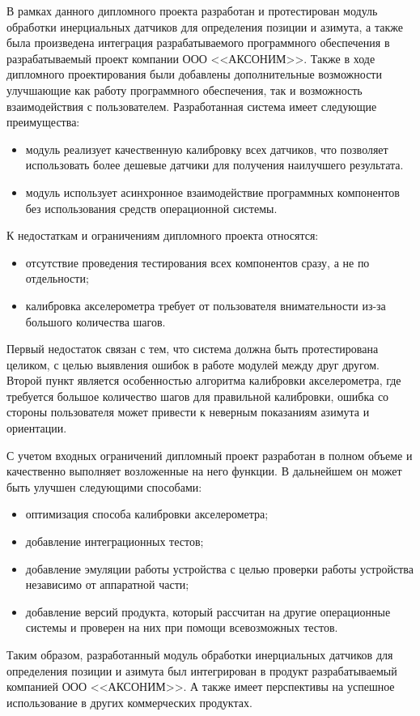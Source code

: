 \label{sec:outro}

В рамках данного дипломного проекта разработан и протестирован модуль обработки инерциальных датчиков для определения позиции и азимута, а также была произведена интеграция
разрабатываемого программного обеспечения в разрабатываемый проект компании ООО <<АКСОНИМ>>. 
Также в ходе дипломного проектирования были добавлены дополнительные возможности улучшающие как работу программного обеспечения, так и возможность взаимодействия с пользователем.
Разработанная система имеет следующие преимущества:

\begin{itemize}
    \item модуль реализует качественную калибровку всех датчиков, что позволяет использовать более дешевые датчики для получения наилучшего результата.
    \item модуль использует асинхронное взаимодействие программных компонентов без использования средств операционной системы.
\end{itemize}

К недостаткам и ограничениям дипломного проекта относятся:

\begin{itemize}
    \item отсутствие проведения тестирования всех компонентов сразу, а не по отдельности;
    \item калибровка акселерометра требует от пользователя внимательности из-за большого количества шагов.
\end{itemize}

Первый недостаток связан с тем, что система должна быть протестирована целиком, с целью выявления ошибок в работе модулей между друг другом.
Второй пункт является особенностью алгоритма калибровки акселерометра, где требуется большое количество шагов для правильной калибровки,
ошибка со стороны пользователя может привести к неверным показаниям азимута и ориентации.

С учетом входных ограничений дипломный проект разработан в
полном объеме и качественно выполняет возложенные на него функции. В
дальнейшем он может быть улучшен следующими способами:

\begin{itemize}
    \item оптимизация способа калибровки акселерометра;
    \item добавление интеграционных тестов;
    \item добавление эмуляции работы устройства с целью проверки работы устройства независимо от аппаратной части;
    \item добавление версий продукта, который рассчитан на другие операционные системы и проверен на них при помощи всевозможных тестов.
\end{itemize}

Таким образом, разработанный модуль обработки инерциальных датчиков для определения позиции и азимута был интегрирован в продукт разрабатываемый компанией 
ООО <<АКСОНИМ>>. А также имеет перспективы на успешное использование в других коммерческих продуктах.
